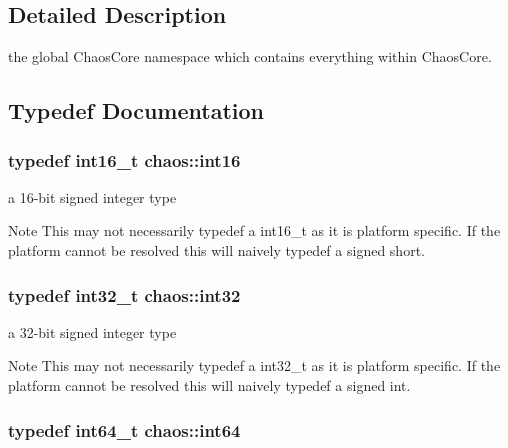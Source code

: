\subsection{Detailed Description}
the global Chaos\-Core namespace which contains everything within Chaos\-Core. 

\subsection{Typedef Documentation}
\hypertarget{namespacechaos_a23112b8188c8a6ad32a86041fb4c088e}{
\subsubsection[{int16}]{\setlength{\rightskip}{0pt plus 5cm}typedef int16\-\_\-t {\bf chaos\-::int16}}}\label{namespacechaos_a23112b8188c8a6ad32a86041fb4c088e}


a 16-\/bit signed integer type 

\begin{DoxyNote}{Note}
This may not necessarily {\ttfamily typedef} a {\ttfamily int16\-\_\-t} as it is platform specific. If the platform cannot be resolved this will naively {\ttfamily typedef} a {\ttfamily signed short}. 
\end{DoxyNote}
\hypertarget{namespacechaos_ad1de7efb430365afd2c9446a0f522a90}{
\subsubsection[{int32}]{\setlength{\rightskip}{0pt plus 5cm}typedef int32\-\_\-t {\bf chaos\-::int32}}}\label{namespacechaos_ad1de7efb430365afd2c9446a0f522a90}


a 32-\/bit signed integer type 

\begin{DoxyNote}{Note}
This may not necessarily {\ttfamily typedef} a {\ttfamily int32\-\_\-t} as it is platform specific. If the platform cannot be resolved this will naively {\ttfamily typedef} a {\ttfamily signed int}. 
\end{DoxyNote}
\hypertarget{namespacechaos_a46c61f58d99879b936f58234b9a05e0c}{
\subsubsection[{int64}]{\setlength{\rightskip}{0pt plus 5cm}typedef int64\-\_\-t {\bf chaos\-::int64}}}\label{namespacechaos_a46c61f58d99879b936f58234b9a05e0c}


